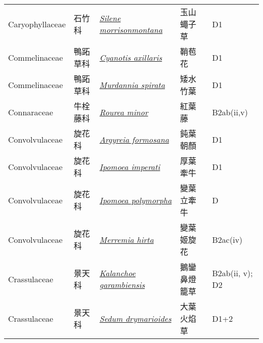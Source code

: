 {\begin{longtable}{p{2.5cm}p{2.5cm}p{4.5cm}p{2.5cm}p{3cm}}
    Caryophyllaceae & 石竹科 & \href{http://www.theplantlist.org/tpl1.1/search?q=Silene+morrisonmontana}{\textit{Silene morrisonmontana} } & 玉山蠅子草 & D1 \index{Silene@\textit{Silene}!morrisonmontana@\textit{morrisonmontana}}  \index{玉山蠅子草} \\
    Commelinaceae & 鴨跖草科 & \href{http://www.theplantlist.org/tpl1.1/search?q=Cyanotis+axillaris}{\textit{Cyanotis axillaris} } & 鞘苞花 & D1 \index{Cyanotis@\textit{Cyanotis}!axillaris@\textit{axillaris}}  \index{鞘苞花} \\
    Commelinaceae & 鴨跖草科 & \href{http://www.theplantlist.org/tpl1.1/search?q=Murdannia+spirata}{\textit{Murdannia spirata} } & 矮水竹葉 & D1 \index{Murdannia@\textit{Murdannia}!spirata@\textit{spirata}}  \index{矮水竹葉} \\
    Connaraceae & 牛栓藤科 & \href{http://www.theplantlist.org/tpl1.1/search?q=Rourea+minor}{\textit{Rourea minor} } & 紅葉藤 & B2ab(ii,v) \index{Rourea@\textit{Rourea}!minor@\textit{minor}}  \index{紅葉藤} \\
    Convolvulaceae & 旋花科 & \href{http://www.theplantlist.org/tpl1.1/search?q=Argyreia+formosana}{\textit{Argyreia formosana} } & 鈍葉朝顏 & D1 \index{Argyreia@\textit{Argyreia}!formosana@\textit{formosana}}  \index{鈍葉朝顏} \\
    Convolvulaceae & 旋花科 & \href{http://www.theplantlist.org/tpl1.1/search?q=Ipomoea+imperati}{\textit{Ipomoea imperati} } & 厚葉牽牛 & D1 \index{Ipomoea@\textit{Ipomoea}!imperati@\textit{imperati}}  \index{厚葉牽牛} \\
    Convolvulaceae & 旋花科 & \href{http://www.theplantlist.org/tpl1.1/search?q=Ipomoea+polymorpha}{\textit{Ipomoea polymorpha} } & 變葉立牽牛 & D \index{Ipomoea@\textit{Ipomoea}!polymorpha@\textit{polymorpha}}  \index{變葉立牽牛} \\
    Convolvulaceae & 旋花科 & \href{http://www.theplantlist.org/tpl1.1/search?q=Merremia+hirta}{\textit{Merremia hirta} } & 變葉姬旋花 & B2ac(iv) \index{Merremia@\textit{Merremia}!hirta@\textit{hirta}}  \index{變葉姬旋花} \\
    Crassulaceae & 景天科 & \href{http://www.theplantlist.org/tpl1.1/search?q=Kalanchoe+garambiensis}{\textit{Kalanchoe garambiensis} } & 鵝鑾鼻燈籠草 & B2ab(ii, v); D2 \index{Kalanchoe@\textit{Kalanchoe}!garambiensis@\textit{garambiensis}}  \index{鵝鑾鼻燈籠草} \\
    Crassulaceae & 景天科 & \href{http://www.theplantlist.org/tpl1.1/search?q=Sedum+drymarioides}{\textit{Sedum drymarioides} } & 大葉火焰草 & D1+2 \index{Sedum@\textit{Sedum}!drymarioides@\textit{drymarioides}}  \index{大葉火焰草} \\

\end{longtable}}
